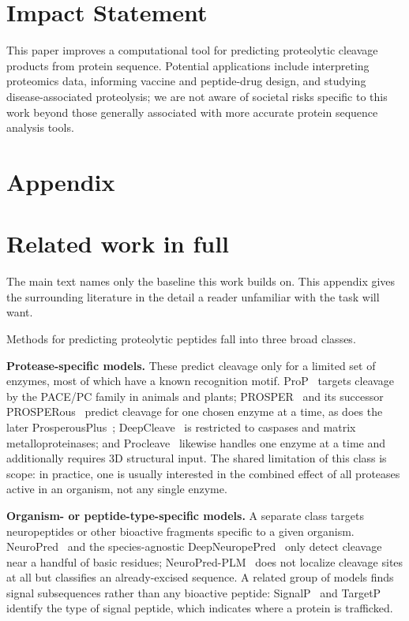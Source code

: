 \documentclass{article}
\begin{document}



\section*{Impact Statement}
This paper improves a computational tool for predicting proteolytic cleavage products from protein sequence. Potential applications include interpreting proteomics data, informing vaccine and peptide-drug design, and studying disease-associated proteolysis; we are not aware of societal risks specific to this work beyond those generally associated with more accurate protein sequence analysis tools.
\newpage
\appendix
\section*{Appendix}

\section{Related work in full}
\label{sec:app-related}\label{sec:related}

The main text names only the baseline this work builds on. This appendix gives the surrounding
literature in the detail a reader unfamiliar with the task will want.


Methods for predicting proteolytic peptides fall into three broad classes.

\textbf{Protease-specific models.} These predict cleavage only for a limited set of enzymes, most of which have a known recognition motif. ProP~\citep{duckert2004prop} targets cleavage by the PACE/PC family in animals and plants; PROSPER~\citep{song2012prosper} and its successor PROSPERous~\citep{song2018prosperous} predict cleavage for one chosen enzyme at a time, as does the later ProsperousPlus~\citep{li2023prosperousplus}; DeepCleave~\citep{li2020deepcleave} is restricted to caspases and matrix metalloproteinases; and Procleave~\citep{li2020procleave} likewise handles one enzyme at a time and additionally requires 3D structural input. The shared limitation of this class is scope: in practice, one is usually interested in the combined effect of all proteases active in an organism, not any single enzyme.

\textbf{Organism- or peptide-type-specific models.} A separate class targets neuropeptides or other bioactive fragments specific to a given organism. NeuroPred~\citep{southey2006neuropred} and the species-agnostic DeepNeuropePred~\citep{wang2024deepneuropepred} only detect cleavage near a handful of basic residues; NeuroPred-PLM~\citep{wang2023neuropredplm} does not localize cleavage sites at all but classifies an already-excised sequence. A related group of models finds signal subsequences rather than any bioactive peptide: SignalP~\citep{teufel2022signalp6} and TargetP~\citep{almagro2019targetp} identify the type of signal peptide, which indicates where a protein is trafficked.
\end{document}
